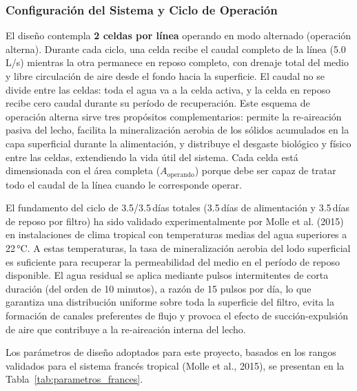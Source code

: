 \subsubsection*{Configuración del Sistema y Ciclo de Operación}

El diseño contempla \textbf{2 celdas por línea} operando en modo alternado (operación alterna). Durante cada ciclo, una celda recibe el caudal completo de la línea (5.0 L/s) mientras la otra permanece en reposo completo, con drenaje total del medio y libre circulación de aire desde el fondo hacia la superficie. El caudal no se divide entre las celdas: toda el agua va a la celda activa, y la celda en reposo recibe cero caudal durante su período de recuperación. Este esquema de operación alterna sirve tres propósitos complementarios: permite la re-aireación pasiva del lecho, facilita la mineralización aerobia de los sólidos acumulados en la capa superficial durante la alimentación, y distribuye el desgaste biológico y físico entre las celdas, extendiendo la vida útil del sistema. Cada celda está dimensionada con el área completa ($A_\text{operando}$) porque debe ser capaz de tratar todo el caudal de la línea cuando le corresponde operar.

El fundamento del ciclo de 3.5/3.5\,días totales (3.5\,días de alimentación y 3.5\,días de reposo por filtro) ha sido validado experimentalmente por Molle et al. (2015) en instalaciones de clima tropical con temperaturas medias del agua superiores a 22\,°C. A estas temperaturas, la tasa de mineralización aerobia del lodo superficial es suficiente para recuperar la permeabilidad del medio en el período de reposo disponible. El agua residual se aplica mediante pulsos intermitentes de corta duración (del orden de 10 minutos), a razón de 15 pulsos por día, lo que garantiza una distribución uniforme sobre toda la superficie del filtro, evita la formación de canales preferentes de flujo y provoca el efecto de succión-expulsión de aire que contribuye a la re-aireación interna del lecho.

Los parámetros de diseño adoptados para este proyecto, basados en los rangos validados para el sistema francés tropical (Molle et al., 2015), se presentan en la Tabla~\ref{tab:parametros_frances}.

